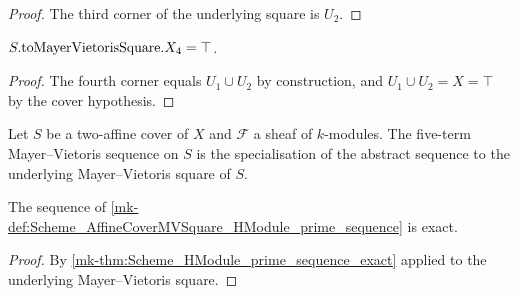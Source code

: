 \begin{proof}
  \leanok


The third corner of the underlying square is \(U_2\).
\end{proof}

\begin{lemma}\label{mk-lem:Scheme_AffineCoverMVSquare_X4}
  \leanok


  \(S.\mathrm{toMayerVietorisSquare}.X_4 = \top\).
\end{lemma}

\begin{proof}
  \leanok


The fourth corner equals \(U_1 \cup U_2\) by construction, and \(U_1 \cup U_2 = X = \top\) by the cover hypothesis.
\end{proof}

\begin{definition}\label{mk-def:Scheme_AffineCoverMVSquare_HModule_prime_sequence}
  \leanok


  Let \(S\) be a two-affine cover of \(X\) and \(\mathcal F\) a sheaf of \(k\)-modules. The five-term Mayer--Vietoris sequence on \(S\) is the specialisation of the abstract sequence to the underlying Mayer--Vietoris square of \(S\).
\end{definition}

\begin{theorem}\label{mk-thm:Scheme_AffineCoverMVSquare_HModule_prime_sequence_exact}
  \leanok


  The sequence of \ref{mk-def:Scheme_AffineCoverMVSquare_HModule_prime_sequence} is exact.
\end{theorem}

\begin{proof}
  \leanok


By \ref{mk-thm:Scheme_HModule_prime_sequence_exact} applied to the underlying Mayer--Vietoris square.
\end{proof}

